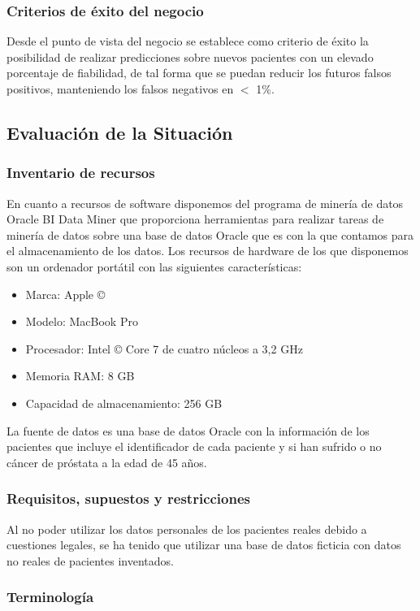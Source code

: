 \documentclass{article}
\begin{document}
\subsubsection{Criterios de éxito del negocio}
Desde el punto de vista del negocio se establece como criterio de éxito la posibilidad de realizar predicciones sobre nuevos pacientes con un elevado porcentaje de fiabilidad, de tal forma que se puedan reducir los futuros falsos positivos, manteniendo los falsos negativos en $<$ 1\%.

\subsection{Evaluación de la Situación}

\subsubsection{Inventario de recursos}
En cuanto a recursos de software disponemos del programa de minería de datos Oracle BI Data Miner que proporciona herramientas para realizar tareas de minería de datos sobre una base de datos Oracle que es con la que contamos para el almacenamiento de los datos. Los recursos de hardware de los que disponemos son un ordenador portátil con las siguientes características:

\begin{itemize}
	\item Marca: Apple ©
	\item Modelo: MacBook Pro
	\item Procesador: Intel © Core 7 de cuatro núcleos a 3,2 GHz
	\item Memoria RAM: 8 GB
	\item Capacidad de almacenamiento: 256 GB
\end{itemize}

La fuente de datos es una base de datos Oracle con la información de los pacientes que incluye el identificador de cada paciente y si han sufrido o no cáncer de próstata a la edad de 45 años.

\subsubsection{Requisitos, supuestos y restricciones}
Al no poder utilizar los datos personales de los pacientes reales debido a cuestiones legales, se ha tenido que utilizar una base de datos ficticia con datos no reales de pacientes inventados.

\subsubsection{Terminología}
\end{document}
